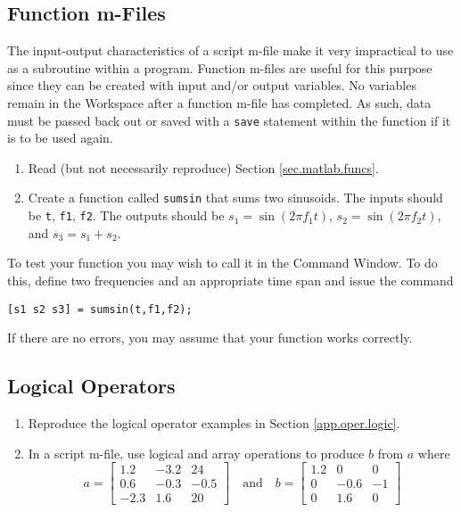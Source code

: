 \subsection{Function m-Files} \label{sec.matlab.func}
The input-output characteristics of a script m-file make it very impractical to use as a subroutine within a program.  Function m-files are useful for this purpose since they can be created with input and/or output variables.  No variables remain in the Workspace after a function m-file has completed.  As such, data must be passed back out or saved with a \verb=save= statement within the function if it is to be used again.
\begin{enumerate}
    \item Read (but not necessarily reproduce) Section \ref{sec.matlab.funcs}.
    \item Create a function called \verb=sumsin= that sums two sinusoids.  The inputs should be \verb=t=, \verb=f1=, \verb=f2=.  The outputs should be $s_1=\sin(2\pi f_1t)$, $s_2=\sin(2\pi f_2t)$, and $s_3 = s_1+s_2$.
\end{enumerate}
To test your function you may wish to call it in the Command Window.  To do this, define two fre\-quencies and an appro\-pri\-ate time span and issue the com\-mand
\begin{verbatim}
[s1 s2 s3] = sumsin(t,f1,f2);
\end{verbatim}
If there are no errors, you may assume that your function works correctly.

\subsection{Logical Operators}
\begin{enumerate}
    \item Reproduce the logical operator examples in Section \ref{app.oper.logic}.
    \item In a script m-file, use logical and array operations to produce $b$ from $a$ where
    \begin{equation*}
    a=\left[ \begin{array}{rrr}
        1.2 &   -3.2    &   24\\
        0.6 &   -0.3    &   -0.5\\
        -2.3&   1.6     &   20   \end{array} \right]
    \quad \mbox{and} \quad
    b= \left[ \begin{array}{rrr}
        1.2 &   0   &   0\\
        0   &   -0.6&   -1 \\
        0   &   1.6 &   0 \end{array} \right]
    \end{equation*}
\end{enumerate}


